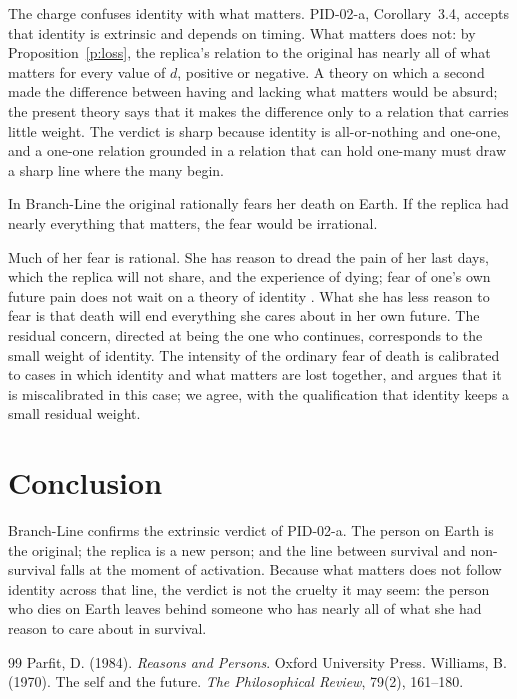 \documentclass{situationist-preprint}
\begin{document}
\begin{reply}
The charge confuses identity with what matters. PID-02-a, Corollary~3.4, accepts that identity is extrinsic and depends on timing. What matters does not: by Proposition~\ref{p:loss}, the replica's relation to the original has nearly all of what matters for every value of $d$, positive or negative. A theory on which a second made the difference between having and lacking what matters would be absurd; the present theory says that it makes the difference only to a relation that carries little weight. The verdict is sharp because identity is all-or-nothing and one-one, and a one-one relation grounded in a relation that can hold one-many must draw a sharp line where the many begin.
\end{reply}

\begin{objection}
In Branch-Line the original rationally fears her death on Earth. If the replica had nearly everything that matters, the fear would be irrational.
\end{objection}

\begin{reply}
Much of her fear is rational. She has reason to dread the pain of her last days, which the replica will not share, and the experience of dying; fear of one's own future pain does not wait on a theory of identity \citep{Williams1970}. What she has less reason to fear is that death will end everything she cares about in her own future. The residual concern, directed at being the one who continues, corresponds to the small weight of identity. The intensity of the ordinary fear of death is calibrated to cases in which identity and what matters are lost together, and \citet[ch.~12]{Parfit1984} argues that it is miscalibrated in this case; we agree, with the qualification that identity keeps a small residual weight.
\end{reply}

\section{Conclusion}

Branch-Line confirms the extrinsic verdict of PID-02-a. The person on Earth is the original; the replica is a new person; and the line between survival and non-survival falls at the moment of activation. Because what matters does not follow identity across that line, the verdict is not the cruelty it may seem: the person who dies on Earth leaves behind someone who has nearly all of what she had reason to care about in survival.

\begin{thebibliography}{99}\small
{} Parfit, D. (1984). \emph{Reasons and Persons}. Oxford University Press.
 Williams, B. (1970). The self and the future. \emph{The Philosophical Review}, 79(2), 161--180.
\end{thebibliography}
\end{document}
